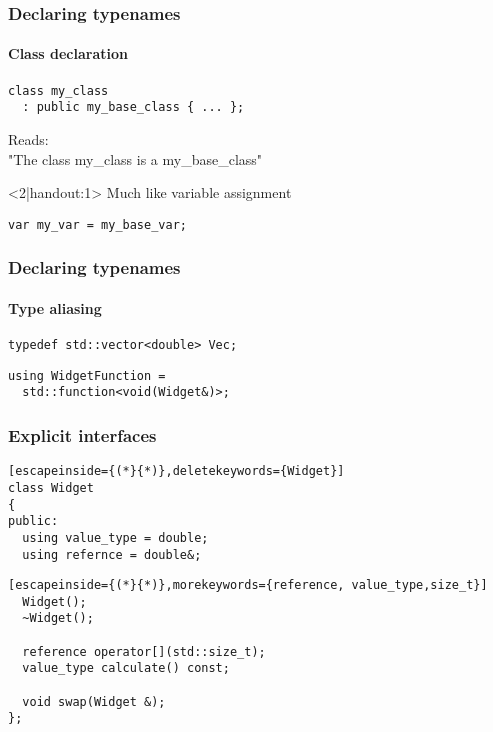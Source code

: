 \documentclass[14pt,a4paper,dvipsnames,usenames]{beamer}
\begin{document}
\begin{frame}[fragile]
  \frametitle{Declaring typenames}
  \framesubtitle{Class declaration}

  \begin{lstlisting}[basicstyle=\ttfamily]
class my_class
  : public my_base_class { ... };
  \end{lstlisting}

  \vspace{.3cm}
  Reads:\\[5pt]
  "The class {\color{Tropiteal}my\_class} is a {\color{Tropiteal}my\_base\_class}"

  \begin{onlyenv}<2|handout:1>
  \vspace{1cm}
  Much like variable assignment

  \vspace{.1cm}
  \begin{lstlisting}[basicstyle=\ttfamily,morekeywords={var}]
var my_var = my_base_var;
  \end{lstlisting}
  \end{onlyenv}

\end{frame}

\begin{frame}[fragile]
  \frametitle{Declaring typenames}
  \framesubtitle{Type aliasing}

  \begin{lstlisting}[basicstyle=\ttfamily]
typedef std::vector<double> Vec;
  \end{lstlisting}

  \vspace{.5cm}
  \begin{lstlisting}[basicstyle=\ttfamily]
using WidgetFunction =
  std::function<void(Widget&)>;
  \end{lstlisting}
  
\end{frame}

\begin{frame}[fragile]
  \frametitle{Explicit interfaces}

  \begin{lstlisting}[escapeinside={(*}{*)},deletekeywords={Widget}]
class Widget
{
public:
  using value_type = double;
  using refernce = double&;
    \end{lstlisting}
    \begin{lstlisting}[escapeinside={(*}{*)},morekeywords={reference, value_type,size_t}]
  Widget();
  ~Widget();

  reference operator[](std::size_t);
  value_type calculate() const;

  void swap(Widget &);
};
  \end{lstlisting}
  
\end{frame}
\end{document}
